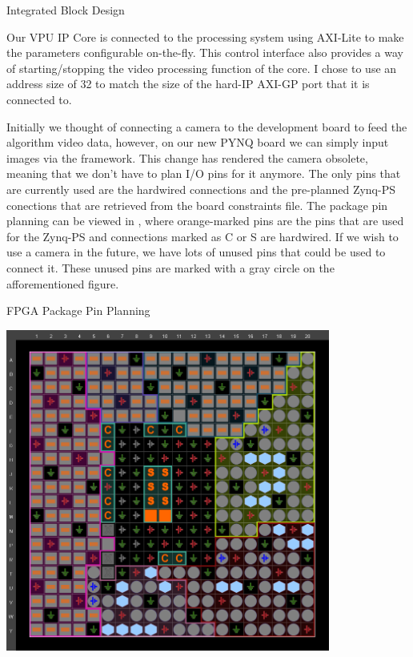 \documentclass{matthijs}
\begin{document}
\begin{hoofdstuk}{Integrated Block Design}
		\bigskip

		Our VPU IP Core is connected to the processing system using AXI-Lite to make the parameters configurable on-the-fly.
		This control interface also provides a way of starting/stopping the video processing function of the core.
		I chose to use an address size of \qty{32}{\bit} to match the size of the hard-IP AXI-GP port that it is connected to.

		\bigskip

		Initially we thought of connecting a camera to the development board to feed the algorithm video data, however, on our new PYNQ board we can simply input images via the framework.
		This change has rendered the camera obsolete, meaning that we don't have to plan I/O pins for it anymore.
		The only pins that are currently used are the hardwired connections and the pre-planned Zynq-PS conections that are retrieved from the board constraints file.
		The package pin planning can be viewed in , where orange-marked pins are the pins that are used for the Zynq-PS and connections marked as C or S are hardwired.
		If we wish to use a camera in the future, we have lots of unused pins that could be used to connect it.
		These unused pins are marked with a gray circle on the afforementioned figure.

		\begin{figuur}{FPGA Package Pin Planning}

			\includegraphics[width=0.8\textwidth]{vivado-synth-package.png}

		\end{figuur}


\end{hoofdstuk}
\end{document}
